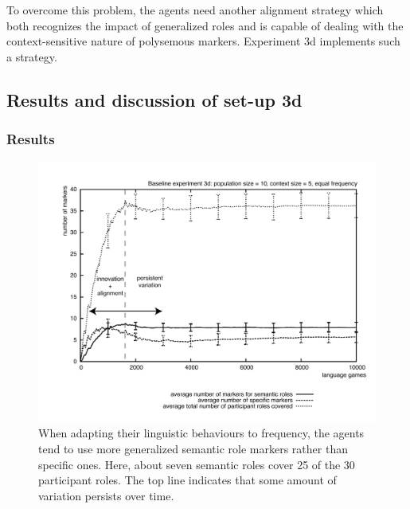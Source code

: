 To overcome this problem, the agents need another alignment strategy which both recognizes the impact of generalized roles and is capable of dealing with the context-sensitive nature of polysemous markers. Experiment 3d implements such a strategy.

\subsection{Results and discussion of set-up 3d}

\subsubsection{Results}
\largerpage

\begin{figure}[b]
\centerline{\includegraphics[width=\textwidth]{Chapter3/figs/graph-base3-success3d}}
  \caption[Baseline experiment 3d: number of markers]{When adapting their linguistic behaviours to frequency, the agents tend to use more generalized semantic role markers rather than specific ones. Here, about seven semantic roles cover 25 of the 30 participant roles. The top line indicates that some amount of variation persists over time.}
   \label{f:base3-size3d}
\end{figure}

